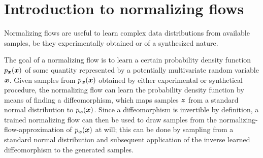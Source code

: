 \documentclass[a4paper,12pt]{report}
\begin{document}
%
\FloatBarrier

\section{Introduction to normalizing flows}
Normalizing flows are useful to learn complex data distributions from available samples, be they experimentally obtained or of a synthesized nature. 

The goal of a normalizing flow is to learn a certain probability density function $p_{\bm{x}}(\bm{x})$ of some quantity represented by a potentially multivariate random variable $\bm{x}$. Given samples from $p_{\bm{x}}(\bm{x})$ obtained by either experimental or synthetical procedure, the normalizing flow can learn the probability density function by means of finding a diffeomorphism, which maps samples $\bm{z}$ from a standard normal distribution to $p_{\bm{x}}(\bm{x})$. Since a diffeomorphism is invertible by definition, a trained normalizing flow can then be used to draw samples from the normalizing-flow-approximation of $p_{\bm{x}}(\bm{x})$ at will; this can be done by sampling from a standard normal distribution and subsequent application of the inverse learned diffeomorphism to the generated samples.
\end{document}
